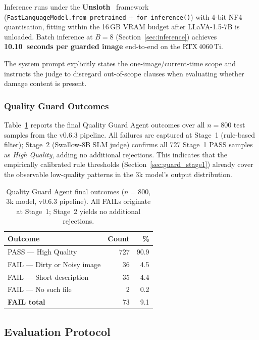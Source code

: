 \documentclass[twocolumn]{article}
\begin{document}
Inference runs under the \textbf{Unsloth}~\cite{han2023unsloth} framework
(\texttt{FastLanguageModel.from\_pretrained} + \texttt{for\_inference()})
with 4-bit NF4 quantisation, fitting within the 16\,GB VRAM budget after
LLaVA-1.5-7B is unloaded.
Batch inference at $B=8$ (Section~\ref{sec:inference}) achieves
\textbf{10.10~seconds per guarded image} end-to-end on the RTX\,4060\,Ti.

The system prompt explicitly states the one-image/current-time scope
and instructs the judge to disregard out-of-scope clauses when
evaluating whether damage content is present.

\subsubsection{Quality Guard Outcomes}

Table~\ref{tab:qg_outcomes} reports the final Quality Guard Agent
outcomes over all $n=800$ test samples from the v0.6.3 pipeline.
All failures are captured at Stage~1 (rule-based filter); Stage~2
(Swallow-8B SLM judge) confirms all 727 Stage~1 PASS samples as
\textit{High Quality}, adding no additional rejections.
This indicates that the empirically calibrated rule thresholds
(Section~\ref{sec:guard_stage1}) already cover the observable
low-quality patterns in the 3k model's output distribution.

\begin{table}[h]
\centering
\caption{Quality Guard Agent final outcomes ($n=800$, 3k model,
         v0.6.3 pipeline). All FAILs originate at Stage~1;
         Stage~2 yields no additional rejections.}
\label{tab:qg_outcomes}
\setlength{\tabcolsep}{3pt}
\begin{tabular}{lrr}
\toprule
\textbf{Outcome} & \textbf{Count} & \textbf{\%} \\
\midrule
PASS --- High Quality          & 727 & 90.9 \\
FAIL --- Dirty or Noisy image  &  36 &  4.5 \\
FAIL --- Short description     &  35 &  4.4 \\
FAIL --- No such file          &   2 &  0.2 \\
\midrule
\textbf{FAIL total}            &  73 &  9.1 \\
\bottomrule
\end{tabular}
\end{table}

\subsection{Evaluation Protocol}
\label{sec:evaluation}
\end{document}
